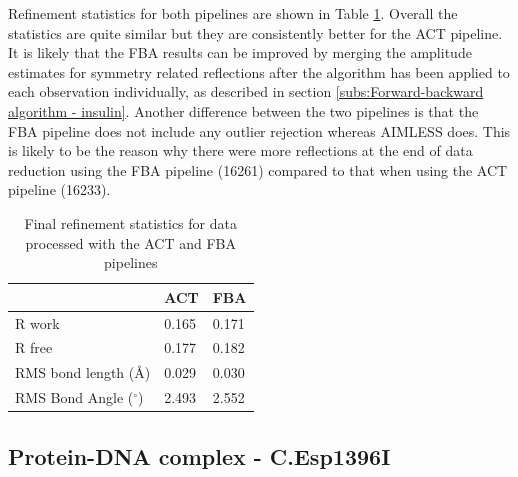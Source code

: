 Refinement statistics for both pipelines are shown in Table \ref{tab:Refinement statistics - insulin}.
Overall the statistics are quite similar but they are consistently better for the ACT pipeline.
It is likely that the FBA results can be improved by merging the amplitude estimates for symmetry related reflections after the algorithm has been applied to each observation individually, as described in section \ref{subs:Forward-backward algorithm - insulin}.
Another difference between the two pipelines is that the FBA pipeline does not include any outlier rejection whereas AIMLESS does.
This is likely to be the reason why there were more reflections at the end of data reduction using the FBA pipeline (16261) compared to that when using the ACT pipeline (16233).

\begin{table}[ht!]
	\caption[Final refinement statistics for data processed with the ACT and FBA pipelines.]{Final refinement statistics for data processed with the ACT and FBA pipelines}
	\centering
	\begin{tabular}{p{4cm} | p{2.5cm} | p{2.5cm}}
		   & ACT & FBA  \\
		\hline
		R work                      & 0.165   & 0.171 \\
		R free                      & 0.177   & 0.182 \\
		RMS bond length (\AA)       & 0.029   & 0.030 \\
        RMS Bond Angle ($^{\circ}$) & 2.493   & 2.552 \\
		\hline
	\end{tabular}
	\label{tab:Refinement statistics - insulin}
\end{table}

\subsection{Protein-DNA complex - C.Esp1396I}
\label{sub:Protein-DNA complex - C.Esp1396I}

